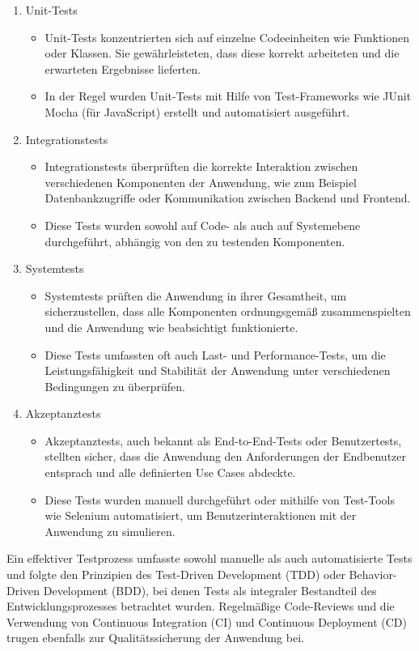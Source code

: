 \begin{flushleft}
	\begin{enumerate}
	\item Unit-Tests
	\begin{itemize}
	\item Unit-Tests konzentrierten sich auf einzelne Codeeinheiten wie Funktionen oder Klassen. Sie gewährleisteten, dass diese korrekt arbeiteten und die erwarteten Ergebnisse lieferten.
	\item In der Regel wurden Unit-Tests mit Hilfe von Test-Frameworks wie JUnit Mocha (für JavaScript) erstellt und automatisiert ausgeführt.
	\end{itemize}
	\item Integrationstests
	\begin{itemize}
	\item Integrationstests überprüften die korrekte Interaktion zwischen verschiedenen Komponenten der Anwendung, wie zum Beispiel Datenbankzugriffe oder Kommunikation zwischen Backend und Frontend.
	\item Diese Tests wurden sowohl auf Code- als auch auf Systemebene durchgeführt, abhängig von den zu testenden Komponenten.
	\end{itemize}
	\item Systemtests
	\begin{itemize}
	\item Systemtests prüften die Anwendung in ihrer Gesamtheit, um sicherzustellen, dass alle Komponenten ordnungsgemäß zusammenspielten und die Anwendung wie beabsichtigt funktionierte.
	\item Diese Tests umfassten oft auch Last- und Performance-Tests, um die Leistungsfähigkeit und Stabilität der Anwendung unter verschiedenen Bedingungen zu überprüfen.
	\end{itemize}
	\item Akzeptanztests
	\begin{itemize}
	\item Akzeptanztests, auch bekannt als End-to-End-Tests oder Benutzertests, stellten sicher, dass die Anwendung den Anforderungen der Endbenutzer entsprach und alle definierten Use Cases abdeckte.
	\item Diese Tests wurden manuell durchgeführt oder mithilfe von Test-Tools wie Selenium automatisiert, um Benutzerinteraktionen mit der Anwendung zu simulieren.
	\end{itemize}
	\end{enumerate}

	Ein effektiver Testprozess umfasste sowohl manuelle als auch automatisierte Tests und folgte den Prinzipien des Test-Driven Development (TDD) oder Behavior-Driven Development (BDD), bei denen Tests als integraler Bestandteil des Entwicklungsprozesses betrachtet wurden. Regelmäßige Code-Reviews und die Verwendung von Continuous Integration (CI) und Continuous Deployment (CD) trugen ebenfalls zur Qualitätssicherung der Anwendung bei.


\end{flushleft}
